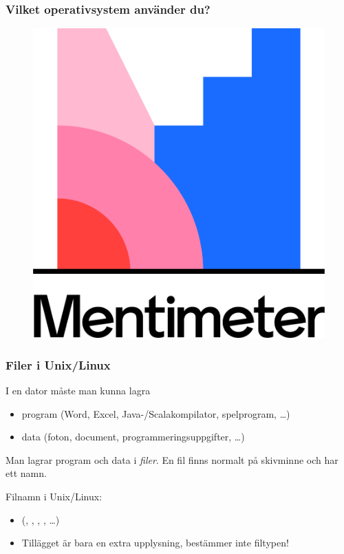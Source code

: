 \begin{frame}[fragile=singleslide]
    \frametitle{Vilket operativsystem använder du?}

    \begin{figure}
        \centering
        \includegraphics[height=0.5\textheight]{images/Mentimeter_Branding_Logo.png}
    \end{figure}

\end{frame}

\begin{frame}[fragile=singleslide]
    \frametitle{Filer i Unix/Linux}
    I en dator måste man kunna lagra
    \begin{itemize}
        \item program (Word, Excel, Java-/Scalakompilator, spelprogram, \ldots)
        \item data (foton, document, programmeringsuppgifter, \ldots)
    \end{itemize}

    \halfblankline

    Man lagrar program och data i \emph{filer}. En fil finns normalt på skivminne och har ett namn.

    \halfblankline

    Filnamn i Unix/Linux:

    \begin{itemize}
        \item {} (, , , , \ldots)
        \item Tillägget är bara en extra upplysning, bestämmer inte filtypen!
    \end{itemize}
\end{frame}

